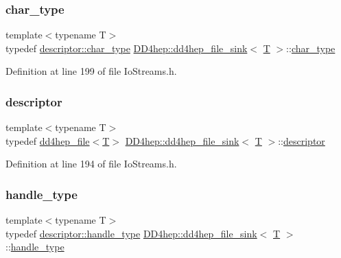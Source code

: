 \subsubsection{\texorpdfstring{char\+\_\+type}{char\_type}}
{\footnotesize\ttfamily template$<$typename T$>$ \\
typedef \hyperlink{class_d_d4hep_1_1dd4hep__file_aef4242f7f2fe15a59f7bf7a8f6ba24d5}{descriptor\+::char\+\_\+type} \hyperlink{class_d_d4hep_1_1dd4hep__file__sink}{D\+D4hep\+::dd4hep\+\_\+file\+\_\+sink}$<$ \hyperlink{class_t}{T} $>$\+::\hyperlink{class_d_d4hep_1_1dd4hep__file_aef4242f7f2fe15a59f7bf7a8f6ba24d5}{char\+\_\+type}}



Definition at line 199 of file Io\+Streams.\+h.

\hypertarget{class_d_d4hep_1_1dd4hep__file__sink_adf4c7b626a18fe2fdaf8a8fb6bf5ea3b}{}\label{class_d_d4hep_1_1dd4hep__file__sink_adf4c7b626a18fe2fdaf8a8fb6bf5ea3b} 
\subsubsection{\texorpdfstring{descriptor}{descriptor}}
{\footnotesize\ttfamily template$<$typename T$>$ \\
typedef \hyperlink{class_d_d4hep_1_1dd4hep__file}{dd4hep\+\_\+file}$<$\hyperlink{class_t}{T}$>$ \hyperlink{class_d_d4hep_1_1dd4hep__file__sink}{D\+D4hep\+::dd4hep\+\_\+file\+\_\+sink}$<$ \hyperlink{class_t}{T} $>$\+::\hyperlink{class_d_d4hep_1_1dd4hep__file__sink_adf4c7b626a18fe2fdaf8a8fb6bf5ea3b}{descriptor}}



Definition at line 194 of file Io\+Streams.\+h.

\hypertarget{class_d_d4hep_1_1dd4hep__file__sink_a660f6328d32832c96f2b59afb2164214}{}\label{class_d_d4hep_1_1dd4hep__file__sink_a660f6328d32832c96f2b59afb2164214} 
\subsubsection{\texorpdfstring{handle\+\_\+type}{handle\_type}}
{\footnotesize\ttfamily template$<$typename T$>$ \\
typedef \hyperlink{class_d_d4hep_1_1dd4hep__file_a4d79f8d433cd7831ff818691424cd6fc}{descriptor\+::handle\+\_\+type} \hyperlink{class_d_d4hep_1_1dd4hep__file__sink}{D\+D4hep\+::dd4hep\+\_\+file\+\_\+sink}$<$ \hyperlink{class_t}{T} $>$\+::\hyperlink{class_d_d4hep_1_1dd4hep__file_a4d79f8d433cd7831ff818691424cd6fc}{handle\+\_\+type}}



